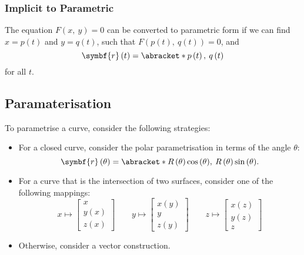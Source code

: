 \documentclass{article}
\begin{document}
\subsubsection{Implicit to Parametric}
The equation \(F\left( x,\: y \right) = 0\) can be converted to parametric form if we can find \(x = p\left( t \right)\) and \(y = q\left( t \right)\),
such that \(F\left( p\left( t \right),\: q\left( t \right) \right) = 0\), and
\begin{equation*}
    \symbf{r}\left( t \right) = \abracket*{p\left( t \right),\: q\left( t \right)}
\end{equation*}
for all \(t\).
\subsection{Paramaterisation}
To parametrise a curve, consider the following strategies:
\begin{itemize}
    \item For a closed curve, consider the polar parametrisation in terms of the angle \(\theta\):
    \begin{equation*}
        \symbf{r}\left( \theta \right) = \abracket*{R\left( \theta \right) \cos{\left( \theta \right)},\: R\left( \theta \right) \sin{\left( \theta \right)}}.
    \end{equation*}
    \item For a curve that is the intersection of two surfaces, consider one of the following mappings:
    \begin{equation*}
        x \mapsto \begin{bmatrix}
            x \\
            y\left( x \right) \\
            z\left( x \right)
        \end{bmatrix} \qquad
        y \mapsto \begin{bmatrix}
            x\left( y \right) \\
            y \\
            z\left( y \right)
        \end{bmatrix} \qquad
        z \mapsto \begin{bmatrix}
            x\left( z \right) \\
            y\left( z \right) \\
            z
        \end{bmatrix}
    \end{equation*}
    \item Otherwise, consider a vector construction.
\end{itemize}
\end{document}
